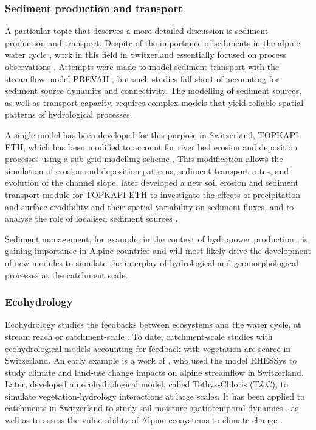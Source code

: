 \documentclass[10pt,a4paper]{article}
\begin{document}
\subsubsection{Sediment production and transport}
\label{sec:context:sediments}
A particular topic that deserves a more detailed discussion is sediment production and transport. Despite of the importance of sediments in the alpine water cycle \citep{Hegg2006}, work in this field in Switzerland essentially focused on process observations \citep{Rickenmann2012}. Attempts were made to model sediment transport with the streamflow model PREVAH \citep{RaymondPralong2015}, but such studies fall short of accounting for sediment source dynamics and connectivity. The modelling of sediment sources, as well as transport capacity, requires complex models that yield reliable spatial patterns of hydrological processes. 

A single model has been developed for this purpose in Switzerland, TOPKAPI-ETH, which has been modified to account for river bed erosion and deposition processes using a sub-grid modelling scheme \citep{Konz2011}. This modification allows the simulation of erosion and deposition patterns, sediment transport rates, and evolution of the channel slope. \citet{Battista2020a} later developed a new soil erosion and sediment transport module for TOPKAPI-ETH to investigate the effects of precipitation and surface erodibility and their spatial variability on sediment fluxes, and to analyse the role of localised sediment sources \citep{Battista2020}. 

Sediment management, for example, in the context of hydropower production \citep{RaymondPralong2015, Gabbud2016}, is gaining importance in Alpine countries and will most likely drive the development of new modules to simulate the interplay of hydrological and geomorphological processes at the catchment scale. 


\subsubsection{Ecohydrology}
\label{sec:context:ecohydrology}

Ecohydrology studies the feedbacks between ecosystems and the water cycle, at stream reach or catchment-scale \citep{Tague2020}. To date, catchment-scale studies with ecohydrological models accounting for feedback with vegetation are scarce in Switzerland. An early example is a work of \citet{Zierl2005}, who used the model RHESSys to study climate and land-use change impacts on alpine streamflow in Switzerland. Later, \citet{Fatichi2012, Fatichi2012a} developed an ecohydrological model, called Tethys-Chloris (T\&C), to simulate vegetation-hydrology interactions at large scales. It has been applied to catchments in Switzerland to study soil moisture spatiotemporal dynamics \citep{Fatichi2015a}, as well as to assess the vulnerability of Alpine ecosystems to climate change \citep{Mastrotheodoros2019}.
\end{document}
